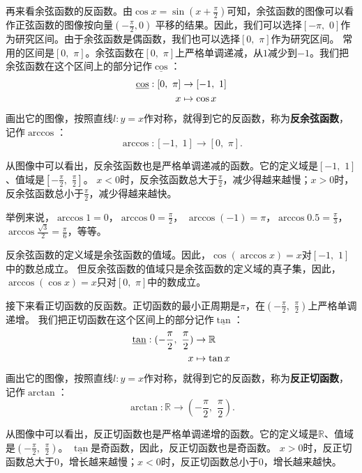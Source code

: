 \documentclass[12pt,UTF8]{ctexbook}
\begin{document}
再来看余弦函数的反函数。由$\cos{x} = \sin(x+\frac{\pi}{2})$可知，余弦函数的图像可以看作正弦函数的图像按向量$\left(-\frac{\pi}{2}, 0\right)$
平移的结果。因此，我们可以选择$[-\pi, \,\, 0]$作为研究区间。由于余弦函数是偶函数，我们也可以选择$[0,\,\,\pi]$作为研究区间。
常用的区间是$[0,\,\,\pi]$。余弦函数在$[0,\,\,\pi]$上严格单调递减，从$1$减少到$-1$。我们把余弦函数在这个区间上的部分记作$\underline{\cos}$：
\begin{align}
    \underline{\cos} : [0,\,\,\pi] &\rightarrow [-1,\,\, 1]\notag \\
                                                          x &\mapsto \cos{x} \notag
\end{align}
画出它的图像，按照直线$l: y = x$作对称，就得到它的反函数，称为\textbf{反余弦函数}，记作$\arccos$：
$$ \arccos : [-1,\,\, 1] \rightarrow [0,\,\,\pi] . $$


从图像中可以看出，反余弦函数也是严格单调递减的函数。它的定义域是$[-1,\,\, 1]$、值域是$[-\frac{\pi}{2}, \,\, \frac{\pi}{2}]$。
$x < 0$时，反余弦函数总大于$\frac{\pi}{2}$，减少得越来越慢；$x > 0$时，反余弦函数总小于$\frac{\pi}{2}$，减少得越来越快。

举例来说，$\arccos{1} = 0$，$\arccos{0} = \frac{\pi}{2}$，
$\arccos{(-1)} = \pi$，$\arccos{0.5} = \frac{\pi}{3}$，$\arccos{\frac{\sqrt{3}}{2}} = \frac{\pi}{6}$，等等。

反余弦函数的定义域是余弦函数的值域。因此，$\cos{(\arccos{x})} = x$对$[-1,\,\, 1]$中的数总成立。
但反余弦函数的值域只是余弦函数的定义域的真子集，因此，$\arccos{(\cos{x})} = x$只对$[0,\,\,\pi]$中的数成立。

接下来看正切函数的反函数。正切函数的最小正周期是$\pi$，在$(-\frac{\pi}{2}, \,\, \frac{\pi}{2})$上严格单调递增。
我们把正切函数在这个区间上的部分记作$\underline{\tan}$：
\begin{align}
    \underline{\tan} : (-\frac{\pi}{2}, \,\, \frac{\pi}{2}) &\rightarrow \mathbb{R} \notag \\
                                                          x &\mapsto \tan{x} \notag
\end{align}
画出它的图像，按照直线$l: y = x$作对称，就得到它的反函数，称为\textbf{反正切函数}，记作$\arctan$：
$$ \arctan : \mathbb{R} \rightarrow (-\frac{\pi}{2}, \,\, \frac{\pi}{2}) . $$


从图像中可以看出，反正切函数也是严格单调递增的函数。它的定义域是$\mathbb{R}$、值域是$(-\frac{\pi}{2}, \,\, \frac{\pi}{2})$。
$\underline{\tan}$是奇函数，因此，反正切函数也是奇函数。
$x > 0$时，反正切函数总大于$0$，增长越来越慢；$x < 0$时，反正切函数总小于$0$，增长越来越快。
\end{document}
